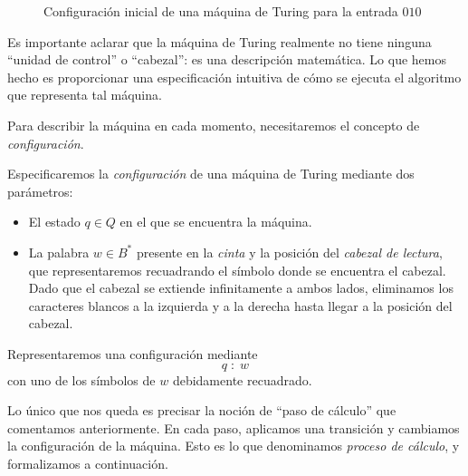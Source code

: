 \begin{figure}[H]
\centering
\vspace{8pt}

\caption{Configuración inicial de una máquina de Turing para la entrada $010$}
\label{fig:maquina-turing}
\end{figure}

Es importante aclarar que la máquina de Turing realmente no tiene ninguna ``unidad de control'' o ``cabezal'': es una descripción matemática. Lo que hemos hecho es proporcionar una especificación intuitiva de cómo se ejecuta el algoritmo que representa tal máquina.

Para describir la máquina en cada momento, necesitaremos el concepto de \emph{configuración}.

\begin{definicion}\label{def:configuracion-maquina-turing}
Especificaremos la \emph{configuración} de una máquina de Turing mediante dos parámetros:

\begin{itemize}
    \item El estado $q\in Q$ en el que se encuentra la máquina.
    \item La palabra $w \in B^*$ presente en la \emph{cinta} y la posición del \emph{cabezal de lectura}, que representaremos recuadrando el símbolo donde se encuentra el cabezal. Dado que el cabezal se extiende infinitamente a ambos lados, eliminamos los caracteres blancos a la izquierda y a la derecha hasta llegar a la posición del cabezal.
\end{itemize}

Representaremos una configuración mediante $$q\;:\;w$$ con uno de los símbolos de $w$ debidamente recuadrado.
\end{definicion}

Lo único que nos queda es precisar la noción de ``paso de cálculo'' que comentamos anteriormente. En cada paso, aplicamos una transición y cambiamos la configuración de la máquina. Esto es lo que denominamos \emph{proceso de cálculo}, y formalizamos a continuación.

